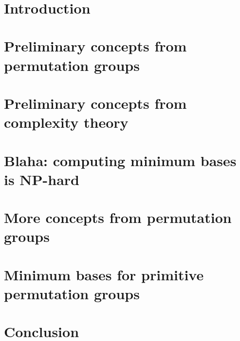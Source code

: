 \documentclass[openany]{book}
\title{\textbf{\TITLE}}
\author{\textbf{\AUTHOR}}
\date{\textbf{\DATE}}
\begin{document}



\tableofcontents

\chapter{Introduction}




\chapter{Preliminary concepts from permutation groups}



\chapter{Preliminary concepts from complexity theory}



\chapter{Blaha: computing minimum bases is NP-hard}



\chapter{More concepts from permutation groups}



\chapter{Minimum bases for primitive permutation groups}



\chapter{Conclusion}



\nocite{*}
\renewcommand{\bibname}{References}

\appendix


\end{document}
